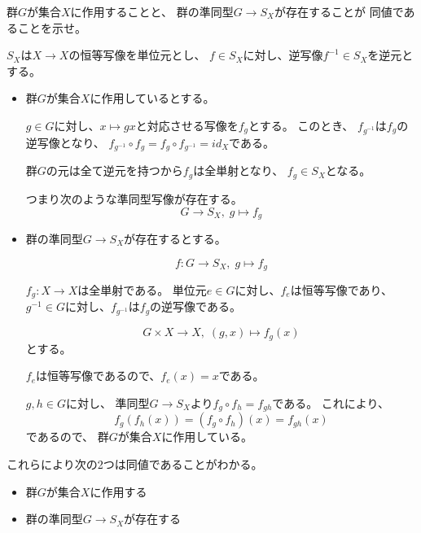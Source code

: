 \documentclass[12pt,b5paper]{ltjsarticle}
\begin{document}
群$G$が集合$X$に作用することと、
群の準同型$G\to S_{X}$が存在することが
同値であることを示せ。

\dotfill

$S_{X}$は$X\to X$の恒等写像を単位元とし、
$f\in S_{X}$に対し、逆写像$f^{-1}\in S_{X}$を逆元とする。


\begin{itemize}
 \item 群$G$が集合$X$に作用しているとする。

       $g\in G$に対し、$x\mapsto gx$と対応させる写像を$f_{g}$とする。
       このとき、
       $f_{g^{-1}}$は$f_{g}$の逆写像となり、
       $f_{g^{-1}} \circ f_{g} = f_{g} \circ f_{g^{-1}} = id_{X}$である。

       群$G$の元は全て逆元を持つから$f_{g}$は全単射となり、
       $f_{g}\in S_{X}$となる。

       つまり次のような準同型写像が存在する。
       \begin{equation}
        G \to S_{X} , \; g \mapsto f_{g}
       \end{equation}

 \item 群の準同型$G\to S_{X}$が存在するとする。

       \begin{equation}
        f: G \to S_{X}, \; g \mapsto f_{g}
       \end{equation}

       $f_{g}:X\to X$は全単射である。
       単位元$e\in G$に対し、$f_{e}$は恒等写像であり、
       $g^{-1}\in G$に対し、$f_{g^{-1}}$は$f_{g}$の逆写像である。

       \begin{equation}
        G\times X \to X , \; (g,x) \mapsto f_{g}(x)
       \end{equation}
       とする。

       $f_{e}$は恒等写像であるので、$f_{e}(x)=x$である。

       $g,h\in G$に対し、
       準同型$G\to S_{X}$より$f_{g}\circ f_{h}=f_{gh}$である。
       これにより、
       \begin{equation}
        f_{g}(f_{h}(x)) = (f_{g}\circ f_{h})(x)= f_{gh}(x)
       \end{equation}
       であるので、
       群$G$が集合$X$に作用している。

\end{itemize}

これらにより次の2つは同値であることがわかる。
\begin{itemize}
 \item 群$G$が集合$X$に作用する
 \item 群の準同型$G\to S_{X}$が存在する
\end{itemize}
\end{document}
